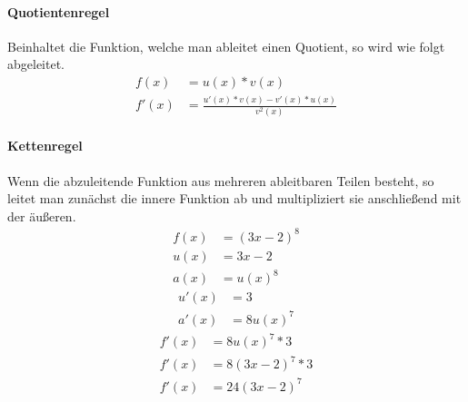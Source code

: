 \documentclass[a4paper]{article}
\begin{document}
				\paragraph{Quotientenregel}
					Beinhaltet die Funktion, welche man ableitet einen Quotient, so wird wie folgt abgeleitet.
					\begin{subequations}
						\begin{align}
							f(x) &= u(x) * v(x)\\
							f'(x) &= \frac{u'(x) * v(x) - v'(x) * u(x)}{v^2(x)}
						\end{align}
					\end{subequations}
				
				\paragraph{Kettenregel}
					Wenn die abzuleitende Funktion aus mehreren ableitbaren Teilen besteht, so leitet man zunächst die innere Funktion ab und multipliziert sie anschließend mit der äußeren.
						\begin{subequations}
							\begin{align}
								f(x) &= (3x - 2)^8\\
								u(x) &= 3x - 2\\
								a(x) &= u(x)^8
							\end{align}
						\end{subequations}
						\begin{subequations}
							\begin{align}
								u'(x) &= 3\\
								a'(x) &= 8u(x)^7
							\end{align}
						\end{subequations}
						\begin{equation}
							\begin{split}
								f'(x) &= 8u(x)^7 * 3\\
								f'(x) &= 8(3x - 2)^7 * 3\\
								f'(x) &= 24(3x - 2)^7
							\end{split}
						\end{equation}
						
					
\end{document}
